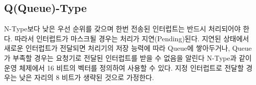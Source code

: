 \subsection{Q(Queue)-Type}
N-Type보다 낮은 우선 순위를 갖으며 한번 전송된 인터럽트는
반드시 처리되어야 한다. 따라서 인터럽트가 마스크될 경우는
처리가 지연(Pending)된다. 지연된 상태에서 새로운 인터럽트가
전달되면 처리기의 저장 능력에 따라 Queue에 쌓아두거나,
Queue가 부족할 경우는 요청기로 전달된 인터럽트를 받을 수 없음을 알린다
N-Type과 같이 운영 체제에서 16 비트의 벡터를 정의하여 사용할 수 있다.
지정 인터럽트로 전달할 경우는 낮은 자리의 8 비트가 생략된 것으로 가정한다.
%
%
